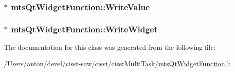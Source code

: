 \subsubsection[{Write\+Value}]{$\ast$ mts\+Qt\+Widget\+Function\+::\+Write\+Value\hspace{0.3cm}{\ttfamily [protected]}}\label{classmts_qt_widget_function_a0e56b1cd0270cbbbb914602ace6f1586}
\hypertarget{classmts_qt_widget_function_a4601b0dcc1cdf04274dd9d924e5b49c5}{}
\subsubsection[{Write\+Widget}]{$\ast$ mts\+Qt\+Widget\+Function\+::\+Write\+Widget\hspace{0.3cm}{\ttfamily [protected]}}\label{classmts_qt_widget_function_a4601b0dcc1cdf04274dd9d924e5b49c5}


The documentation for this class was generated from the following file\+:\begin{DoxyCompactItemize}
\item 
/\+Users/anton/devel/cisst-\/saw/cisst/cisst\+Multi\+Task/\hyperlink{mts_qt_widget_function_8h}{mts\+Qt\+Widget\+Function.\+h}\end{DoxyCompactItemize}
